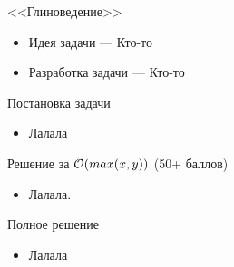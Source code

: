 \begin{frame}
  \begin{center}
    \LARGE <<Глиноведение>>
  \end{center}

  \begin{itemize}
  \item Идея задачи --- Кто-то
  \item Разработка задачи --- Кто-то
  \end{itemize}

\end{frame}

\begin{frame}{Постановка задачи}

  \begin{itemize}
  \item Лалала
  \end{itemize}
  
\end{frame}

\begin{frame}{Решение за $\mathcal{O}(max(x, y))$ (50+ баллов)}
  \begin{itemize}
  \item Лалала.
  \end{itemize}
\end{frame}

\begin{frame}{Полное решение}
  \begin{itemize}
  \item Лалала
  \end{itemize}
\end{frame}
